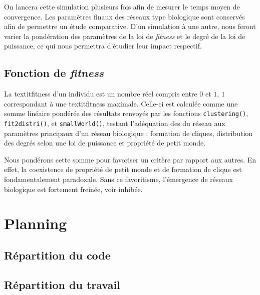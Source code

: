 On lancera cette simulation plusieurs fois afin de mesurer le temps moyen de convergence.
Les paramètres finaux des réseaux type \og biologique \fg sont conservés afin de permettre un étude comparative. D'un simulation à une autre, nous feront varier la pondération des paramètres de la loi de \textit{fitness} et le degré de la loi de puissance, ce qui nous permettra d'étudier leur impact respectif.

\subsection{Fonction de \textit{fitness} }
\label{fitness}
La textit{fitness} d'un individu est un nombre réel compris entre $0$ et $1$, $1$ correspondant à une textit{fitness} maximale.
Celle-ci est calculée comme une somme linéaire pondérée des résultats renvoyés par les fonctions \texttt{clustering()}, \texttt{fit2distri()}, et \texttt{smallWorld()}, testant l'adéquation des du réseau aux paramètres principaux d'un réseau biologique : formation de cliques, distribution des degrés selon une loi de puissance et propriété de petit monde.

\medskip
Nous pondérons cette somme pour favoriser un critère par rapport aux autres. En effet, la coexistence de propriété de petit monde et de formation de clique est fondamentalement paradoxale. Sans ce favoritisme, l'émergence de réseaux biologique est fortement freinée, voir inhibée.

\section{Planning}
\subsection{Répartition du code}

\subsection{Répartition du travail}

